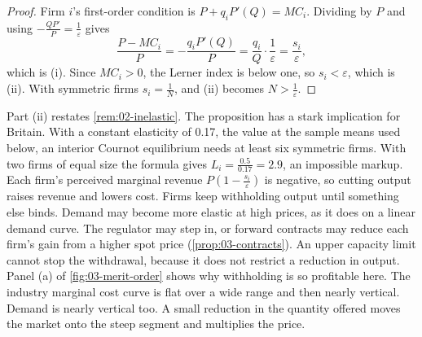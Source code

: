 \begin{proof}
Firm $i$'s first-order condition is $P + q_i P'(Q) = MC_i$. Dividing by $P$ and using $-\frac{Q P'}{P} =
\frac{1}{\varepsilon}$ gives
\begin{equation*}
\frac{P - MC_i}{P} = -\frac{q_i P'(Q)}{P} = \frac{q_i}{Q}\cdot\frac{1}{\varepsilon} = \frac{s_i}{\varepsilon},
\end{equation*}
which is (i). Since $MC_i > 0$, the Lerner index is below one, so $s_i < \varepsilon$, which is (ii). With symmetric
firms $s_i = \frac{1}{N}$, and (ii) becomes $N > \frac{1}{\varepsilon}$.
\end{proof}

Part (ii) restates \cref{rem:02-inelastic}. The proposition has a stark implication for Britain. With a constant
elasticity of 0.17, the value at the sample means used below, an interior Cournot equilibrium needs at least six
symmetric firms. With two firms of equal size the formula gives
$L_i = \frac{0.5}{0.17} = 2.9$, an impossible markup. Each firm's perceived marginal revenue
$P(1 - \frac{s_i}{\varepsilon})$ is negative, so cutting output raises revenue and lowers cost. Firms keep withholding
output until something else binds. Demand may become more elastic at high prices, as it does on a linear demand curve.
The regulator may step in, or forward contracts may reduce each firm's gain from a higher spot price
(\cref{prop:03-contracts}). An upper capacity limit cannot stop the withdrawal, because it does not restrict a
reduction in output. Panel (a) of \cref{fig:03-merit-order} shows why
withholding is so profitable here. The industry marginal cost curve is flat over a wide range and then nearly
vertical. Demand is nearly vertical too. A small reduction in the quantity offered moves the market onto the steep
segment and multiplies the price.


